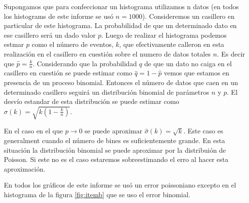 \documentclass{article}
\begin{document}
Supongamos que para confeccionar un histograma utilizamos n datos (en todos los histograms de este informe se usó $n=1000$).
Consideremos un casillero en particular de este histograma.
La probabilidad de que un determinado dato en ese casillero será un dado valor $p$.
Luego de realizar el histograma podemos estmar $p$ como el número de eventos, $k$, que efectivamente calleron en esta realización en el casillero en cuestión sobre el numero de datos totales $n$.
Es decir que $\hat p = \frac{k}{n}$.
Considerando que la probabilidad $q$ de que un dato no caiga en el casillero en cuestión se puede estimar como $\hat q = 1 - \hat p$ vemos que estamos en presencia de un proceso binomial.
Entonces el número de datos que caen en un determinado casillero seguirá un distribución binomial de parámetros $n$ y $p$.
El desvío estandar de esta distribución se puede estimar como $\hat \sigma(k) = \sqrt{k (1 - \frac{k}{n})}$.

En el caso en el que $p\rightarrow 0$ se puede aproximar $\hat \sigma(k) = \sqrt{k}$.
Este caso es generalment cuando el número de bines es suficientemente grande.
En esta situación la distribución binomial se puede aproximar por la distribuión de Poisson.
Si este no es el caso estaremos sobreestimando el erro al hacer esta aproximación.


En todos los gráficos de este informe se usó un error poissoniano excepto en el histograma de la figura \ref{fig:itemb} que se uso el error binomial.
\end{document}

